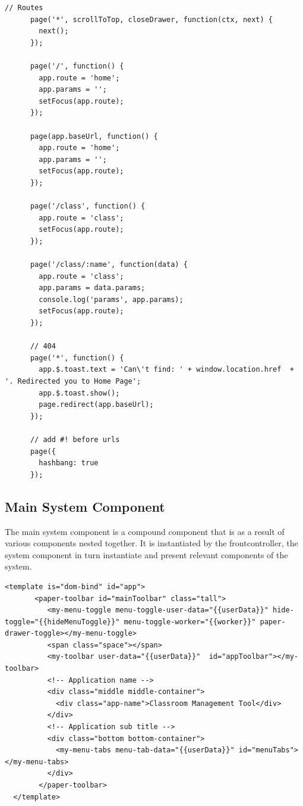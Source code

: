 
\begin{lstlisting}[caption={Routing by frontcontroller}, label={lst:routing}]
    // Routes
      page('*', scrollToTop, closeDrawer, function(ctx, next) {
        next();
      });

      page('/', function() {
        app.route = 'home';
        app.params = '';
        setFocus(app.route);
      });

      page(app.baseUrl, function() {
        app.route = 'home';
        app.params = '';
        setFocus(app.route);
      });

      page('/class', function() {
        app.route = 'class';
        setFocus(app.route);
      });

      page('/class/:name', function(data) {
        app.route = 'class';
        app.params = data.params;
        console.log('params', app.params);
        setFocus(app.route);
      });

      // 404
      page('*', function() {
        app.$.toast.text = 'Can\'t find: ' + window.location.href  + '. Redirected you to Home Page';
        app.$.toast.show();
        page.redirect(app.baseUrl);
      });

      // add #! before urls
      page({
        hashbang: true
      });
\end{lstlisting}


\subsection{Main System Component}
The main system component is a compound component that is as a result of various components nested together. It is instantiated by the frontcontroller, the system component in turn instantiate and present relevant components of the system.

\begin{lstlisting}[caption={System Component Instantiated Declaratively}, label={lst:App}]
   <template is="dom-bind" id="app">
       <paper-toolbar id="mainToolbar" class="tall">
          <my-menu-toggle menu-toggle-user-data="{{userData}}" hide-toggle="{{hideMenuToggle}}" menu-toggle-worker="{{worker}}" paper-drawer-toggle></my-menu-toggle>
          <span class="space"></span>
          <my-toolbar user-data="{{userData}}"  id="appToolbar"></my-toolbar>
          <!-- Application name -->
          <div class="middle middle-container">
            <div class="app-name">Classroom Management Tool</div>
          </div>
          <!-- Application sub title -->
          <div class="bottom bottom-container">
            <my-menu-tabs menu-tab-data="{{userData}}" id="menuTabs"></my-menu-tabs>
          </div>
        </paper-toolbar>
  </template>
\end{lstlisting}

